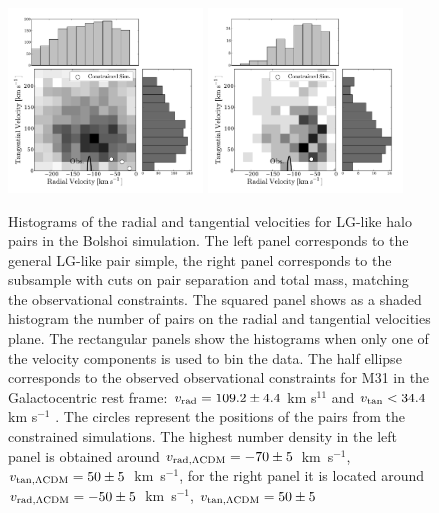 \documentclass{emulateapj}
\newcommand{\kms}{\,km~s$^{-1}$}
\begin{document}
\begin{figure}
\begin{center}
\includegraphics[keepaspectratio=true,width=0.46\textwidth]{./figures/test_rt_BDM.pdf}
\includegraphics[keepaspectratio=true,width=0.46\textwidth]{./figures/test_rt_BDM_narrow.pdf}
\caption{Histograms of the radial and tangential velocities for
  LG-like halo pairs in the Bolshoi simulation. The left panel
  corresponds to the general LG-like pair simple, the right panel
  corresponds to the subsample with cuts on pair separation and total
  mass, matching the observational constraints. The squared panel
  shows as a shaded histogram the number of pairs on the radial and
  tangential velocities plane. The rectangular panels show the
  histograms when only one of the velocity components is used to bin
  the data. The half ellipse corresponds to the observed observational
  constraints for M31 in the Galactocentric rest frame: $v_{\rm
    rad}=109.2\pm 4.4$ km s$^{11}$ and $v_{\rm tan}< 34.4$ km s$^{-1}$
  \citep{vanderMarel12}. The circles represent the positions of the
  pairs from the constrained simulations. The highest number density
  in the left panel is obtained around $v_{\rm rad,\Lambda CDM} =
  -70\pm5$ \kms, $v_{\rm tan,\Lambda CDM} = 50\pm5$ \kms, for the
  right panel it is located around $v_{\rm rad,\Lambda CDM} = -50\pm5$
  \kms, $v_{\rm tan,\Lambda CDM} = 50\pm5$ } 
\label{fig:rt}
\end{center}

\end{figure}
\end{document}
